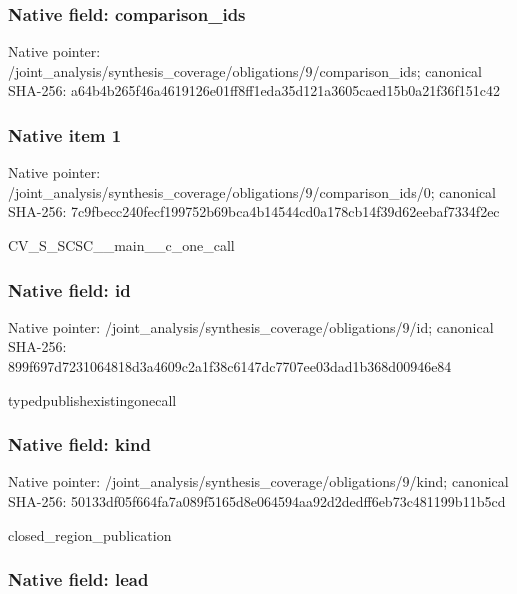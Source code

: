 \documentclass[10pt,a4paper]{article}
\begin{document}
\subsubsection{Native field: comparison\_ids}


Native pointer: /joint\_analysis/synthesi\allowbreak{}s\_coverage/obligations/9\allowbreak{}/comparison\_ids; canonical SHA-256: a64b4b265f46a4619126e01f\allowbreak{}f8ff1eda35d121a3605caed1\allowbreak{}5b0a21f36f151c42



\subsubsection{Native item 1}


Native pointer: /joint\_analysis/synthesi\allowbreak{}s\_coverage/obligations/9\allowbreak{}/comparison\_ids/0; canonical SHA-256: 7c9fbecc240fecf199752b69\allowbreak{}bca4b14544cd0a178cb14f39\allowbreak{}d62eebaf7334f2ec


CV\_S\_SCSC\_\_main\_\_c\_one\_call


\subsubsection{Native field: id}


Native pointer: /joint\_analysis/synthesi\allowbreak{}s\_coverage/obligations/9\allowbreak{}/id; canonical SHA-256: 899f697d7231064818d3a460\allowbreak{}9c2a1f38c6147dc7707ee03d\allowbreak{}ad1b368d00946e84


typedpublishexistingonecall


\subsubsection{Native field: kind}


Native pointer: /joint\_analysis/synthesi\allowbreak{}s\_coverage/obligations/9\allowbreak{}/kind; canonical SHA-256: 50133df05f664fa7a089f516\allowbreak{}5d8e064594aa92d2dedff6eb\allowbreak{}73c481199b11b5cd


closed\_region\_publication


\subsubsection{Native field: lead}
\end{document}
